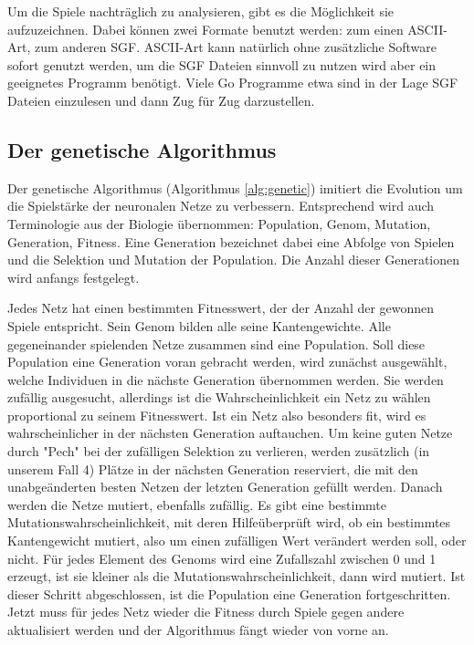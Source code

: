 Um die Spiele nachträglich zu analysieren, gibt es die Möglichkeit sie
aufzuzeichnen. Dabei können zwei Formate benutzt werden: zum einen ASCII-Art,
zum anderen SGF. ASCII-Art kann natürlich ohne zusätzliche Software sofort
genutzt werden, um die SGF Dateien sinnvoll zu nutzen wird aber ein geeignetes
Programm benötigt. Viele Go Programme etwa sind in der Lage SGF Dateien
einzulesen und dann Zug für Zug darzustellen. 

\subsection{Der genetische Algorithmus}

Der genetische Algorithmus (Algorithmus \ref{alg:genetic}) imitiert die
Evolution um die Spielstärke der neuronalen Netze zu verbessern. Entsprechend
wird auch Terminologie aus der Biologie übernommen: Population, Genom,
Mutation, Generation, Fitness. Eine Generation bezeichnet dabei eine Abfolge
von Spielen und die Selektion und Mutation der Population. Die Anzahl dieser
Generationen wird anfangs festgelegt.

Jedes Netz hat einen bestimmten Fitnesswert, der der Anzahl der gewonnen Spiele
entspricht. Sein Genom bilden alle seine Kantengewichte. Alle gegeneinander
spielenden Netze zusammen sind eine Population. Soll diese Population eine
Generation voran gebracht werden, wird zunächst ausgewählt, welche Individuen in
die nächste Generation übernommen werden. Sie werden zufällig ausgesucht,
allerdings ist die Wahrscheinlichkeit ein Netz zu wählen proportional zu seinem
Fitnesswert. Ist ein Netz also besonders fit, wird es wahrscheinlicher in der
nächsten Generation auftauchen. Um keine guten Netze durch "Pech" bei der 
zufälligen Selektion zu verlieren, werden zusätzlich (in unserem Fall 4) Plätze 
in der nächsten Generation reserviert, die mit den unabgeänderten besten Netzen 
der letzten Generation gefüllt werden. Danach werden die Netze mutiert, 
ebenfalls zufällig. Es gibt eine bestimmte Mutationswahrscheinlichkeit, mit 
deren Hilfeüberprüft wird, ob ein bestimmtes Kantengewicht mutiert, also um einen
zufälligen Wert verändert werden soll, oder nicht. Für jedes Element des Genoms
wird eine Zufallszahl zwischen 0 und 1 erzeugt, ist sie kleiner als die
Mutationswahrscheinlichkeit, dann wird mutiert. Ist dieser Schritt abgeschlossen, 
ist die Population eine Generation fortgeschritten. Jetzt muss für jedes Netz 
wieder die Fitness durch Spiele gegen andere aktualisiert werden und der 
Algorithmus fängt wieder von vorne an.


